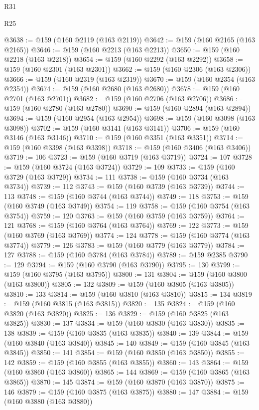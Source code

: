 \begin{lexlean}{R31}
\begin{lexlean}{R25}
\begin{coremodule}
{{{{{{{{{{{{{{{{{{{{{{{{{{{{{{{{{{{{{{{{{{{{{{{{{{{{{{{{{{{{{{{{{{{{{{{{{{{{{{{{{{{{{{{{{{{{{{{{{{{{{{{{{{{{{{{{{{{{{{{{{{{{{{{{{{{{{{{{{{{{{{{{{{{{{{{{{{{{{{{{{{{{{{{{{{{{{{{{{{{{{{{{{{{{{{{{{{{{{{{@3638 := @159 (@160 @2119 (@163 @2119))
@3642 := @159 (@160 @2165 (@163 @2165))
@3646 := @159 (@160 @2213 (@163 @2213))
@3650 := @159 (@160 @2218 (@163 @2218))
@3654 := @159 (@160 @2292 (@163 @2292))
@3658 := @159 (@160 @2301 (@163 @2301))
@3662 := @159 (@160 @2306 (@163 @2306))
@3666 := @159 (@160 @2319 (@163 @2319))
@3670 := @159 (@160 @2354 (@163 @2354))
@3674 := @159 (@160 @2680 (@163 @2680))
@3678 := @159 (@160 @2701 (@163 @2701))
@3682 := @159 (@160 @2706 (@163 @2706))
@3686 := @159 (@160 @2780 (@163 @2780))
@3690 := @159 (@160 @2894 (@163 @2894))
@3694 := @159 (@160 @2954 (@163 @2954))
@3698 := @159 (@160 @3098 (@163 @3098))
@3702 := @159 (@160 @3141 (@163 @3141))
@3706 := @159 (@160 @3146 (@163 @3146))
@3710 := @159 (@160 @3351 (@163 @3351))
@3714 := @159 (@160 @3398 (@163 @3398))
@3718 := @159 (@160 @3406 (@163 @3406))
@3719 := 106
@3723 := @159 (@160 @3719 (@163 @3719))
@3724 := 107
@3728 := @159 (@160 @3724 (@163 @3724))
@3729 := 109
@3733 := @159 (@160 @3729 (@163 @3729))
@3734 := 111
@3738 := @159 (@160 @3734 (@163 @3734))
@3739 := 112
@3743 := @159 (@160 @3739 (@163 @3739))
@3744 := 113
@3748 := @159 (@160 @3744 (@163 @3744))
@3749 := 118
@3753 := @159 (@160 @3749 (@163 @3749))
@3754 := 119
@3758 := @159 (@160 @3754 (@163 @3754))
@3759 := 120
@3763 := @159 (@160 @3759 (@163 @3759))
@3764 := 121
@3768 := @159 (@160 @3764 (@163 @3764))
@3769 := 122
@3773 := @159 (@160 @3769 (@163 @3769))
@3774 := 124
@3778 := @159 (@160 @3774 (@163 @3774))
@3779 := 126
@3783 := @159 (@160 @3779 (@163 @3779))
@3784 := 127
@3788 := @159 (@160 @3784 (@163 @3784))
@3789 := @159 @2385
@3790 := 129
@3794 := @159 (@160 @3790 (@163 @3790))
@3795 := 130
@3799 := @159 (@160 @3795 (@163 @3795))
@3800 := 131
@3804 := @159 (@160 @3800 (@163 @3800))
@3805 := 132
@3809 := @159 (@160 @3805 (@163 @3805))
@3810 := 133
@3814 := @159 (@160 @3810 (@163 @3810))
@3815 := 134
@3819 := @159 (@160 @3815 (@163 @3815))
@3820 := 135
@3824 := @159 (@160 @3820 (@163 @3820))
@3825 := 136
@3829 := @159 (@160 @3825 (@163 @3825))
@3830 := 137
@3834 := @159 (@160 @3830 (@163 @3830))
@3835 := 138
@3839 := @159 (@160 @3835 (@163 @3835))
@3840 := 139
@3844 := @159 (@160 @3840 (@163 @3840))
@3845 := 140
@3849 := @159 (@160 @3845 (@163 @3845))
@3850 := 141
@3854 := @159 (@160 @3850 (@163 @3850))
@3855 := 142
@3859 := @159 (@160 @3855 (@163 @3855))
@3860 := 143
@3864 := @159 (@160 @3860 (@163 @3860))
@3865 := 144
@3869 := @159 (@160 @3865 (@163 @3865))
@3870 := 145
@3874 := @159 (@160 @3870 (@163 @3870))
@3875 := 146
@3879 := @159 (@160 @3875 (@163 @3875))
@3880 := 147
@3884 := @159 (@160 @3880 (@163 @3880))
}}}}}}}}}}}}}}}}}}}}}}}}}}}}}}}}}}}}}}}}}}}}}}}}}}}}}}}}}}}}}}}}}}}}}}}}}}}}}}}}}}}}}}}}}}}}}}}}}}}}}}}}}}}}}}}}}}}}}}}}}}}}}}}}}}}}}}}}}}}}}}}}}}}}}}}}}}}}}}}}}}}}}}}}}}}}}}}}}}}}}}}}}}}}}}}}}}}}}}}
\end{coremodule}
\end{lexlean}
\end{lexlean}
